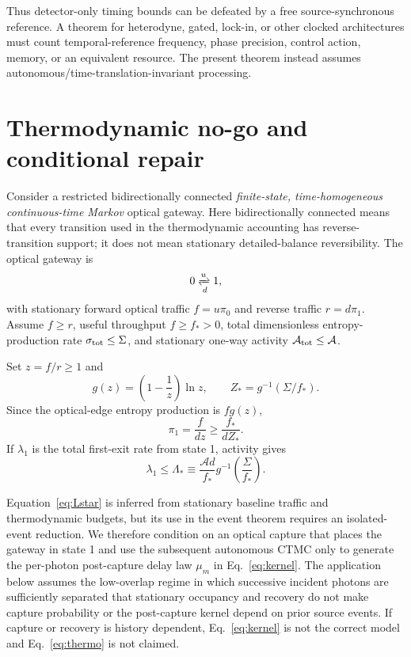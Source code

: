 \documentclass[aps,prapplied,preprint,nofootinbib]{revtex4-2}
\begin{document}
Thus detector-only timing bounds can be defeated by a free source-synchronous reference. A theorem for heterodyne, gated, lock-in, or other clocked architectures must count temporal-reference frequency, phase precision, control action, memory, or an equivalent resource. The present theorem instead assumes autonomous/time-translation-invariant processing.

\section{Thermodynamic no-go and conditional repair}
\label{sec:thermo}

Consider a restricted bidirectionally connected \emph{finite-state, time-homogeneous continuous-time Markov} optical gateway. Here bidirectionally connected means that every transition used in the thermodynamic accounting has reverse-transition support; it does not mean stationary detailed-balance reversibility. The optical gateway is
\begin{equation}
0\xrightleftharpoons[d]{u}1,
\end{equation}
with stationary forward optical traffic $f=u\pi_0$ and reverse traffic $r=d\pi_1$. Assume $f\ge r$, useful throughput $f\ge f_*>0$, total dimensionless entropy-production rate $\sigma_{\rm tot}\le\Sigma$, and stationary one-way activity $\mathcal A_{\rm tot}\le\mathcal A$.

Set $z=f/r\ge1$ and
\begin{equation}
g(z)=\left(1-\frac1z\right)\ln z,
\qquad
Z_*=g^{-1}(\Sigma/f_*).
\end{equation}
Since the optical-edge entropy production is $f g(z)$,
\begin{equation}
\pi_1=\frac{f}{dz}\ge\frac{f_*}{dZ_*}.
\end{equation}
If $\lambda_1$ is the total first-exit rate from state 1, activity gives
\begin{equation}
\boxed{
\lambda_1\le\Lambda_*
\equiv\frac{\mathcal A d}{f_*}
 g^{-1}\!\left(\frac{\Sigma}{f_*}\right).}
\label{eq:Lstar}
\end{equation}

Equation~\eqref{eq:Lstar} is inferred from stationary baseline traffic and thermodynamic budgets, but its use in the event theorem requires an isolated-event reduction. We therefore condition on an optical capture that places the gateway in state 1 and use the subsequent autonomous CTMC only to generate the per-photon post-capture delay law $\mu_m$ in Eq.~\eqref{eq:kernel}. The application below assumes the low-overlap regime in which successive incident photons are sufficiently separated that stationary occupancy and recovery do not make capture probability or the post-capture kernel depend on prior source events. If capture or recovery is history dependent, Eq.~\eqref{eq:kernel} is not the correct model and Eq.~\eqref{eq:thermo} is not claimed.
\end{document}
